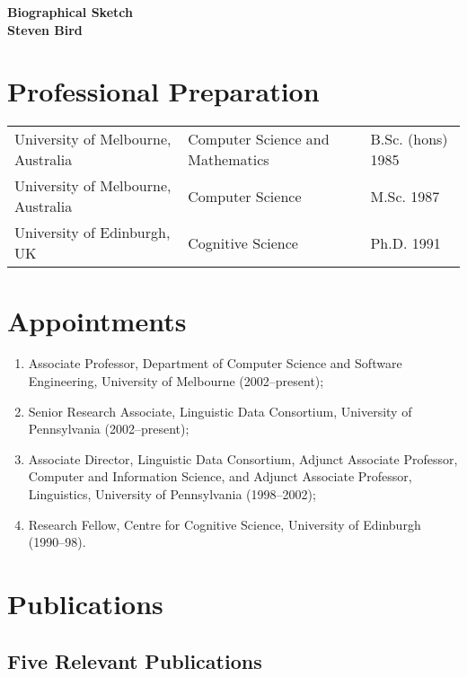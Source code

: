 \documentclass[11pt]{article}
\begin{document}
\begin{center}
{\large\bf Biographical Sketch\\[15pt] Steven Bird}
\end{center}

\section{Professional Preparation}

\begin{tabular}{lll}
University of Melbourne, Australia & Computer Science and Mathematics & B.Sc. (hons) 1985 \\
University of Melbourne, Australia & Computer Science &  M.Sc. 1987 \\
University of Edinburgh, UK & Cognitive Science & Ph.D. 1991 \\
\end{tabular}

\section{Appointments}

\begin{enumerate}
\item Associate Professor, Department of Computer Science and
  Software Engineering, University of Melbourne (2002--present);

\item Senior Research Associate, Linguistic Data Consortium,
  University of Pennsylvania (2002--present);

\item Associate Director, Linguistic Data Consortium,
  Adjunct Associate Professor, Computer and Information Science, and
  Adjunct Associate Professor, Linguistics,
  University of Pennsylvania (1998--2002);

\item Research Fellow, Centre for Cognitive Science,
    University of Edinburgh (1990--98).
\end{enumerate}

\section{Publications}

\subsection{Five Relevant Publications}
\end{document}
